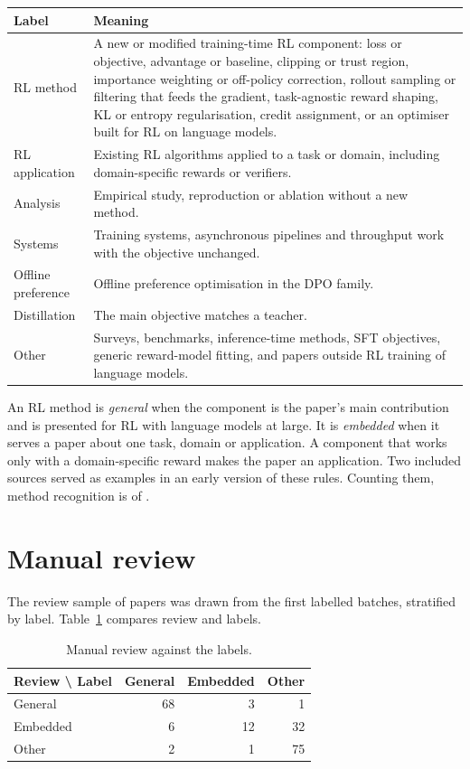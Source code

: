 \documentclass{article}
\begin{document}
\begin{table}[!htbp]
\centering
\small
\begin{tabularx}{\linewidth}{l >{\raggedright\arraybackslash}X}
\toprule
Label & Meaning \\
\midrule
RL method & A new or modified training-time RL component: loss or objective, advantage or baseline, clipping or trust region, importance weighting or off-policy correction, rollout sampling or filtering that feeds the gradient, task-agnostic reward shaping, KL or entropy regularisation, credit assignment, or an optimiser built for RL on language models. \\
RL application & Existing RL algorithms applied to a task or domain, including domain-specific rewards or verifiers. \\
Analysis & Empirical study, reproduction or ablation without a new method. \\
Systems & Training systems, asynchronous pipelines and throughput work with the objective unchanged. \\
Offline preference & Offline preference optimisation in the DPO family. \\
Distillation & The main objective matches a teacher. \\
Other & Surveys, benchmarks, inference-time methods, SFT objectives, generic reward-model fitting, and papers outside RL training of language models. \\
\bottomrule
\end{tabularx}
\end{table}

An RL method is \emph{general} when the component is the paper's main contribution and is presented for RL with language models at large. It is \emph{embedded} when it serves a paper about one task, domain or application. A component that works only with a domain-specific reward makes the paper an application. Two included sources served as examples in an early version of these rules. Counting them, method recognition is \RecallHit{} of \RecallAll{}.

\section{Manual review}
\label{app:review}

The review sample of \ReviewAll{} papers was drawn from the first labelled batches, stratified by label. Table~\ref{tab:review} compares review and labels.

\begin{table}[!htbp]
\centering
\small
\caption{Manual review against the labels.}
\label{tab:review}
\begin{tabular}{lrrr}
\toprule
Review \textbackslash{} Label & General & Embedded & Other \\
\midrule
General & 68 & 3 & 1 \\
Embedded & 6 & 12 & 32 \\
Other & 2 & 1 & 75 \\
\bottomrule
\end{tabular}
\end{table}
\end{document}

